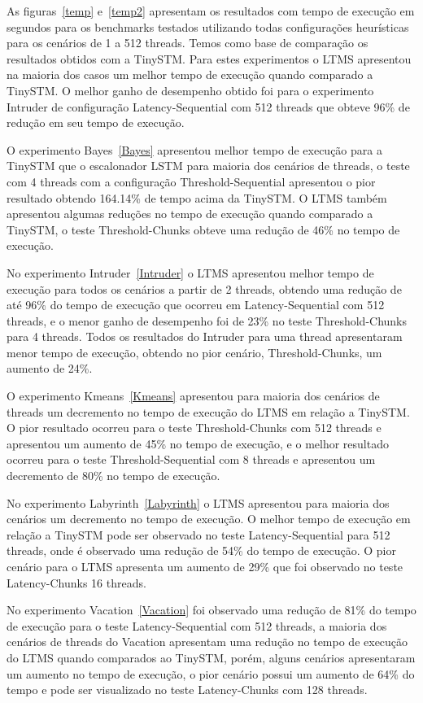 \documentclass[diss,capa]{texufpel}
\begin{document}
As figuras~\ref{temp} e~\ref{temp2} apresentam os resultados com tempo de execução em segundos para os benchmarks testados utilizando todas configurações heurísticas para os cenários de 1 a 512 threads. Temos como base de comparação os resultados obtidos com a TinySTM. Para estes experimentos o LTMS apresentou na maioria dos casos um melhor tempo de execução quando comparado a TinySTM. O melhor ganho de desempenho obtido foi para o experimento Intruder de configuração Latency-Sequential com 512 threads que obteve 96\% de redução em seu tempo de execução.

O experimento Bayes~\ref{Bayes} apresentou melhor tempo de execução para a TinySTM que o escalonador LSTM para maioria dos cenários de threads, o teste com 4 threads com a configuração Threshold-Sequential apresentou o pior resultado obtendo 164.14\% de tempo acima da TinySTM. O LTMS também apresentou algumas reduções no tempo de execução quando comparado a TinySTM, o teste Threshold-Chunks obteve uma redução de 46\% no tempo de execução.

No experimento Intruder~\ref{Intruder} o LTMS apresentou melhor tempo de execução para todos os cenários a partir de 2 threads, obtendo uma redução de até 96\% do tempo de execução que ocorreu em Latency-Sequential com 512 threads, e o menor ganho de desempenho foi de 23\% no teste Threshold-Chunks para 4 threads. Todos os resultados do Intruder para uma thread apresentaram menor tempo de execução, obtendo no pior cenário, Threshold-Chunks, um aumento de 24\%.

O experimento Kmeans~\ref{Kmeans} apresentou para maioria dos cenários de threads um decremento no tempo de execução do LTMS em relação a TinySTM. O pior resultado ocorreu para o teste Threshold-Chunks com 512 threads e apresentou um aumento de 45\% no tempo de execução, e o melhor resultado ocorreu para o teste Threshold-Sequential com 8 threads e apresentou um decremento de 80\% no tempo de execução.



No experimento Labyrinth~\ref{Labyrinth} o LTMS apresentou para maioria dos cenários um decremento no tempo de execução. O melhor tempo de execução em relação a TinySTM pode ser observado no teste Latency-Sequential para 512 threads, onde é observado uma redução de 54\% do tempo de execução. O pior cenário para o LTMS apresenta um aumento de 29\% que foi observado no teste Latency-Chunks 16 threads.

No experimento Vacation~\ref{Vacation} foi observado uma redução de 81\% do tempo de execução para o teste Latency-Sequential com 512 threads, a maioria dos cenários de threads do Vacation apresentam uma redução no tempo de execução do LTMS quando comparados ao TinySTM, porém, alguns cenários apresentaram um aumento no tempo de execução, o pior cenário possui um aumento de 64\% do tempo e pode ser visualizado no teste Latency-Chunks com 128 threads.
\end{document}
